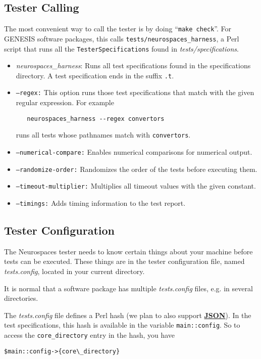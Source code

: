 \documentclass[12pt]{article}
\begin{document}
\subsection*{Tester Calling}

The most convenient way to call the tester is by doing ``{\tt make check}''. For GENESIS software packages, this calls {\tt tests/neurospaces\_harness}, a Perl script that runs all the {\tt TesterSpecifications} found in {\it tests/specifications}.

\begin{itemize}
\item {\it neurospaces\_harness}: Runs all test specifications found in the specifications directory. A test specification ends in the suffix {\tt .t}.
\item {\tt --regex:} This option runs those test specifications that match with the given regular expression. For example
\begin{verbatim}
   neurospaces_harness --regex convertors
\end{verbatim}
runs all tests whose pathnames match with {\tt convertors}.
\item {\tt --numerical-compare:} Enables numerical comparisons for numerical output.
\item {\tt --randomize-order:} Randomizes the order of the tests before executing them.
\item {\tt --timeout-multiplier:} Multiplies all timeout values with the given constant.
\item {\tt --timings:} Adds timing information to the test report.
\end{itemize}
    
\subsection*{Tester Configuration}

The Neurospaces tester needs to know certain things about your machine before tests can be executed. These things are in the tester configuration file, named {\it tests.config}, located in your current directory.

It is normal that a software package has multiple {\it tests.config} files, e.g. in several directories.

The {\it tests.config} file defines a Perl hash (we plan to also support \href{http://www.json.org/}{\bf JSON}). In the test specifications, this hash is available in the variable {\tt main::config}. So to access the {\tt core\_directory} entry in the hash, you have
\begin{verbatim}
$main::config->{core\_directory}
\end{verbatim}
\end{document}
